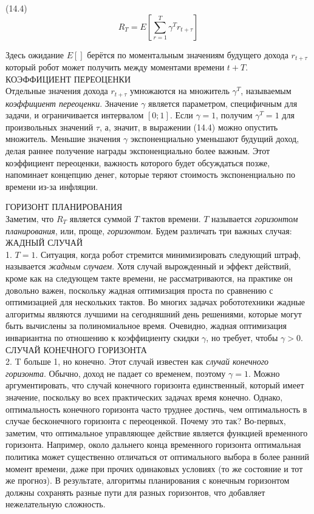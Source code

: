 \documentclass[10pt,a4paper]{article}
\begin{document}
(14.4)
$$R_T=E\left[\sum_{r=1}^T \gamma^Tr_{t+\tau} \right] $$

Здесь ожидание $E[ ]$ берётся по моментальным значениям будущего дохода $r_{t+\tau}$ который робот может получить между моментами времени $t+T$.\\ 
КОЭФФИЦИЕНТ ПЕРЕОЦЕНКИ\\
Отдельные значения дохода $r_{t+\tau}$ умножаются на множитель $\gamma^T$, называемым \textit{коэффициент переоценки}. Значение $\gamma$ является параметром, специфичным для задачи, и ограничивается интервалом $[0; 1]$. Если $\gamma = 1$, получим $\gamma^T = 1$ для произвольных значений $\tau$,  а, значит, в выражении (14.4) можно опустить множитель. Меньшие значения $\gamma$ экспоненциально уменьшают будущий доход, делая раннее получение награды экспоненциально более важным. Этот коэффициент переоценки, важность которого будет обсуждаться позже, напоминает концепцию денег, которые теряют стоимость экспоненциально по времени из-за инфляции.

ГОРИЗОНТ ПЛАНИРОВАНИЯ\\

Заметим, что $R_T$ является суммой $T$ тактов времени. $T$ называется \textit{горизонтом планирования}, или, проще, \textit{горизонтом}. Будем различать три важных случая:\\

ЖАДНЫЙ СЛУЧАЙ\\

1.	$T = 1$. Ситуация, когда робот стремится  минимизировать следующий штраф, называется \textit{жадным случаем}. Хотя случай вырожденный и эффект действий, кроме как на следующем такте времени, не рассматриваются, на практике он довольно важен, поскольку жадная оптимизация проста по сравнению с оптимизацией для нескольких тактов. Во многих задачах робототехники жадные алгоритмы являются лучшими на сегодняшний день решениями, которые могут быть вычислены за полиномиальное время. Очевидно, жадная оптимизация инвариантна по отношению к коэффициенту скидки $\gamma$, но требует, чтобы $\gamma>0$.\\

СЛУЧАЙ КОНЕЧНОГО ГОРИЗОНТА\\

2.	T больше 1, но конечно. Этот случай известен как \textit{случай конечного горизонта}. Обычно, доход не падает со временем, поэтому $\gamma = 1$. Можно аргументировать, что случай конечного горизонта единственный, который имеет значение, поскольку во всех практических задачах время конечно. Однако, оптимальность конечного горизонта часто труднее достичь, чем оптимальность в случае бесконечного горизонта с переоценкой. Почему это так? Во-первых, заметим, что оптимальное управляющее действие является функцией временного горизонта. Например, около дальнего конца временного горизонта оптимальная политика может существенно отличаться от оптимального выбора в более ранний момент времени, даже при прочих одинаковых условиях (то же состояние и тот же прогноз). В результате, алгоритмы планирования с конечным горизонтом должны сохранять разные пути для разных горизонтов, что добавляет нежелательную сложность.\\
\end{document}
